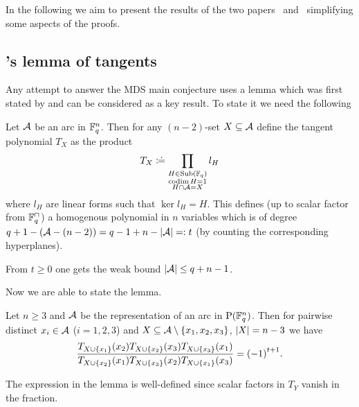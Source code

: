 In the following we aim to present the results of the two papers~\cite{ball2011mdsmainconjI} and~\cite{ball2012mdsmainconjII} simplifying some aspects of the proofs.

\subsection{'s lemma of tangents}%

Any attempt to answer the MDS main conjecture uses a lemma which was first stated by  and can be considered as a key result. To state it we need the following

\begin{definition}
    Let $\mathcal{A}$ be an arc in $\mathbb{F}_{q}^n$. Then for any $(n-2)$-set $X\subseteq \mathcal{A}$ define the tangent polynomial $T_X$ as the product
    $$
    T_X\mathrel{\mathrel{\mathop:}\mkern-1.2mu\doteq}\prod_{\substack{H\in\mathop\mathrm{Sub}\nolimits(\mathbb{F}_{q})\\ \mathop\mathrm{codim}{H}=1\\ H\cap\mathcal{A}=X}}{l_H}
    $$
    where $l_H$ are linear forms such that $\ker{l_H}=H$. This defines (up to scalar factor from $\units{\field{q}}$) a homogenous polynomial in $n$ variables which is of degree $q+1-(\mathcal{A}-(n-2))=q-1+n-\left|\mathcal{A}\right|=:t$ (by counting the corresponding hyperplanes).
\end{definition}

\begin{remark}
    From $t\geq 0$ one gets the weak bound $\left|\mathcal{A}\right|\leq q+n-1$.
\end{remark}

Now we are able to state the lemma.

\begin{lemma}
  Let $n\geq3$ and $\mathcal{A}$ be the representation of an arc in $\P(\field{q}^n)$. Then for pairwise distinct $x_i\in \mathcal{A}$ ($i=1,2,3$) and $X\subseteq \mathcal{A}\setminus\left\{x_1,x_2,x_3\right\}$, $\left|X\right|=n-3$ we have
  $$    \frac{T_{X\cup\left\{x_1\right\}}(x_2)T_{X\cup\left\{x_2\right\}}(x_3)T_{X\cup\left\{x_3\right\}}(x_1)}{T_{X\cup\left\{x_2\right\}}(x_1)T_{X\cup\left\{x_3\right\}}(x_2)T_{X\cup\left\{x_1\right\}}(x_3)}={(-1)}^{t+1}.
  $$
\end{lemma}

\begin{remark}
    The expression in the lemma is well-defined since scalar factors in $T_Y$ vanish in the fraction.
\end{remark}

